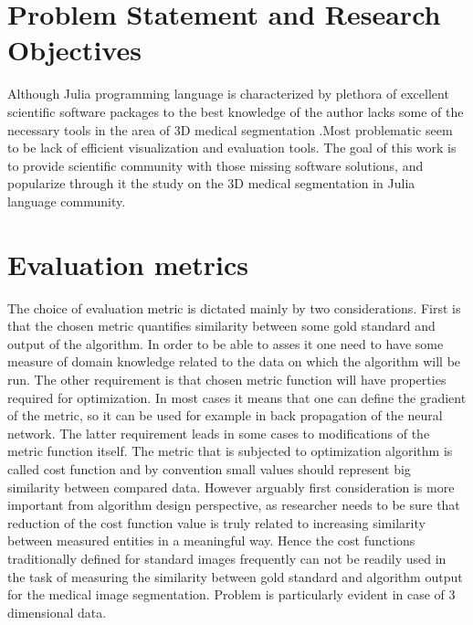 \documentclass{juliacon}
\begin{document}
\section{Problem Statement and Research Objectives}
Although Julia programming language is characterized by plethora of excellent scientific software packages to the best knowledge of the author lacks some of the necessary tools in the area of 3D medical segmentation .Most problematic seem to be lack of efficient visualization and evaluation tools. The goal of this work is to provide scientific community with those missing software solutions, and popularize through it the study on the 3D medical segmentation in Julia language community.


\section{Evaluation metrics}

The choice of evaluation metric is dictated mainly by two considerations. First is that the chosen metric quantifies similarity between some gold standard and output of the algorithm. In order to be able to asses it one need to have some measure of domain knowledge related to the data on which the algorithm will be run.  The other requirement is that chosen metric function will have properties required for optimization. In most cases it means that one can define the gradient of the metric, so it can be used for example in back propagation of the neural network. The latter requirement leads in some cases to modifications of the metric function itself. The metric that is subjected to optimization algorithm is called cost function and by convention small values should represent big similarity between compared data.  However arguably first consideration is more important from algorithm design perspective, as researcher needs to be sure that reduction of the cost function value is truly related to increasing similarity between measured entities in a meaningful way. Hence the cost functions traditionally defined for standard images frequently can not be readily used in the task of measuring the similarity between gold standard and algorithm output for the medical image segmentation. Problem is particularly evident in case of 3 dimensional data.
\end{document}
